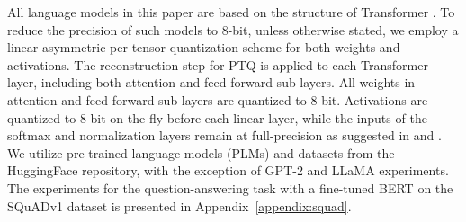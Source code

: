 \documentclass{article}
\theoremstyle{plain}
\theoremstyle{definition}
\theoremstyle{remark}
\begin{document}
\begin{table}[t]
\begin{center}
{\begin{tabular}{clcccccccc}
\bottomrule
\end{tabular}
}
\end{center}
\vskip -0.15in
\end{table}




All language models in this paper are based on the structure of Transformer \citep{vaswani2017attention}. To reduce the precision of such models to $8$-bit, unless otherwise stated, we employ a linear asymmetric per-tensor quantization scheme for both weights and activations. The reconstruction step for PTQ is applied to each Transformer layer, including both attention and feed-forward sub-layers.
All weights in attention and feed-forward sub-layers are quantized to $8$-bit.
Activations are quantized to $8$-bit on-the-fly before each linear layer, while the inputs of the softmax and normalization layers remain at full-precision as suggested in \citet{zafrir2019q8bert} and \citet{zhang2020ternarybert}. We utilize pre-trained language models (PLMs) and datasets from the HuggingFace \citep{wolf-etal-2020-transformers} repository, with the exception of GPT-2 and LLaMA experiments. %
The experiments for the question-answering task with a fine-tuned BERT on the SQuADv1 \citep{2016arXiv160605250R} dataset is presented in Appendix~\ref{appendix:squad}.
\end{document}
